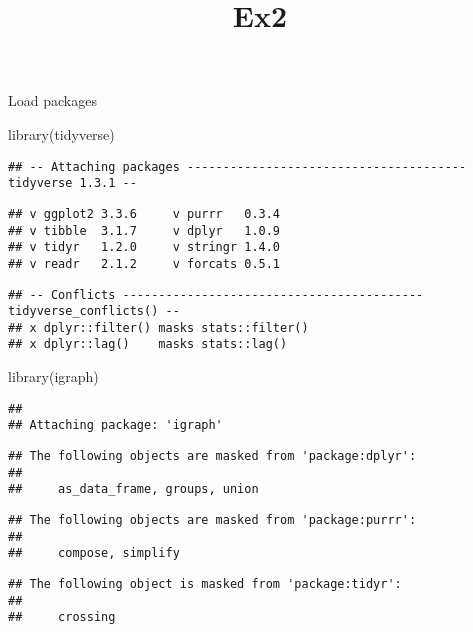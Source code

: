 \documentclass[
]{article}
\title{Ex2}
\author{}
\date{\vspace{-2.5em}}
\newenvironment{Shaded}{\begin{snugshade}}{\end{snugshade}}
\newcommand{\FunctionTok}[1]{\textcolor[rgb]{0.00,0.00,0.00}{#1}}
\newcommand{\NormalTok}[1]{#1}
\begin{document}
\maketitle

Load packages

\begin{Shaded}
\begin{Highlighting}[]
\FunctionTok{library}\NormalTok{(tidyverse)}
\end{Highlighting}
\end{Shaded}

\begin{verbatim}
## -- Attaching packages --------------------------------------- tidyverse 1.3.1 --
\end{verbatim}

\begin{verbatim}
## v ggplot2 3.3.6     v purrr   0.3.4
## v tibble  3.1.7     v dplyr   1.0.9
## v tidyr   1.2.0     v stringr 1.4.0
## v readr   2.1.2     v forcats 0.5.1
\end{verbatim}

\begin{verbatim}
## -- Conflicts ------------------------------------------ tidyverse_conflicts() --
## x dplyr::filter() masks stats::filter()
## x dplyr::lag()    masks stats::lag()
\end{verbatim}

\begin{Shaded}
\begin{Highlighting}[]
\FunctionTok{library}\NormalTok{(igraph)}
\end{Highlighting}
\end{Shaded}

\begin{verbatim}
## 
## Attaching package: 'igraph'
\end{verbatim}

\begin{verbatim}
## The following objects are masked from 'package:dplyr':
## 
##     as_data_frame, groups, union
\end{verbatim}

\begin{verbatim}
## The following objects are masked from 'package:purrr':
## 
##     compose, simplify
\end{verbatim}

\begin{verbatim}
## The following object is masked from 'package:tidyr':
## 
##     crossing
\end{verbatim}
\end{document}
